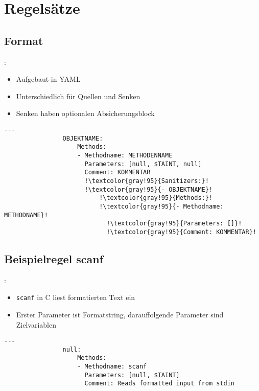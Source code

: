 \section{Regelsätze}
    \subsection{Format}
        \begin{frame}[fragile]{\secname: \subsecname}
            \begin{itemize}
                \item Aufgebaut in YAML
                \item Unterschiedlich für Quellen und Senken
                \item[\textrightarrow] Senken haben optionalen Absicherungsblock
            \end{itemize}
            \begin{lstlisting}[gobble=16, escapechar=!]
                ---
                OBJEKTNAME:
                    Methods:
                    - Methodname: METHODENNAME
                      Parameters: [null, $TAINT, null]
                      Comment: KOMMENTAR
                      !\textcolor{gray!95}{Sanitizers:}!
                      !\textcolor{gray!95}{- OBJEKTNAME}!
                          !\textcolor{gray!95}{Methods:}!
                          !\textcolor{gray!95}{- Methodname: METHODNAME}!
                            !\textcolor{gray!95}{Parameters: []}!
                            !\textcolor{gray!95}{Comment: KOMMENTAR}!
            \end{lstlisting}
        \end{frame}

    \subsection{Beispielregel scanf}
        \begin{frame}[fragile]{\secname: \subsecname}
            \begin{itemize}
                \item \texttt{scanf} in C liest formatierten Text ein
                \item Erster Parameter ist Formatstring, darauffolgende Parameter sind Zielvariablen
            \end{itemize}
            \begin{lstlisting}[gobble=16]
                ---
                null:
                    Methods:
                    - Methodname: scanf
                      Parameters: [null, $TAINT]
                      Comment: Reads formatted input from stdin
            \end{lstlisting}
        \end{frame}


